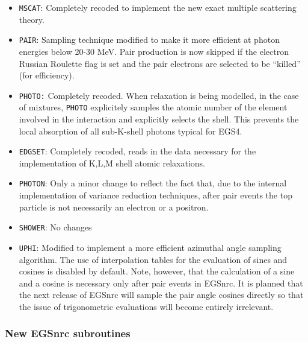 \begin{itemize}
\item
{\tt MSCAT}: Completely recoded to implement the
new exact multiple scattering theory.

\item
{\tt PAIR}: Sampling technique modified to make it
more efficient at photon energies below 20-30 MeV.
Pair production is now skipped if the electron Russian Roulette
flag is set and the pair electrons are selected to be ``killed''
(for efficiency).

\item
{\tt PHOTO:} Completely recoded. When relaxation is being modelled,
in the case of mixtures, {\tt PHOTO}
explicitely samples the atomic number of the element involved in the
interaction and explicitly selects the shell.
This prevents the local absorption of all sub-K-shell
photons typical for EGS4.

\item
{\tt EDGSET}: Completely recoded, reads in the data necessary
for the implementation of K,L,M shell atomic relaxations.


\item
{\tt PHOTON}: Only a minor change to reflect the fact that,
due to the internal implementation of variance reduction techniques,
after pair events the top particle is not necessarily an electron
or a positron.

\item
{\tt SHOWER}: No changes

 
\item
{\tt UPHI}: Modified to implement a more efficient azimuthal
angle sampling algorithm. The use of interpolation tables
for the evaluation of sines and cosines is disabled by default.
Note, however, that the calculation of a sine and a cosine is
necessary only after pair events in EGSnrc. It is planned
that the next release of EGSnrc will sample the pair angle cosines
directly so that the issue of trigonometric evaluations will become
entirely irrelevant.
\end{itemize}

\subsubsection{New EGSnrc subroutines}

